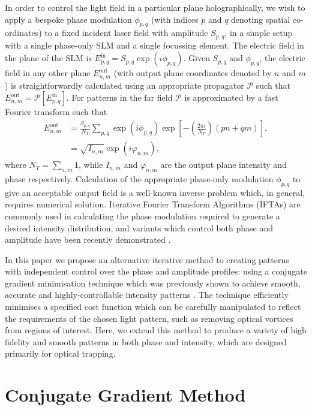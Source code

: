 \documentclass[amsmath,onecolumn,superscriptaddress,notitlepage]{revtex4-1}
\begin{document}
In order to control the light field in a particular plane holographically, we wish to apply a bespoke phase modulation $\phi_{p,q}$ (with indices $p$ and $q$ denoting spatial co-ordinates) to a fixed incident laser field with amplitude $S_{p,q}$, in a simple setup with a single phase-only SLM and a single focussing element. The electric field in the plane of the SLM is $E^{\text{in}}_{p,q} = S_{p,q}\exp\left(i\phi_{p,q}\right)$. Given $S_{p,q}$ and $\phi_{p,q}$, the electric field in any other plane $E^{\text{out}}_{n,m}$ (with output plane coordinates denoted by $n$ and $m$) is straightforwardly calculated using an appropriate propagator $\mathcal{P}$ such that $E^{\text{out}}_{n,m}=\mathcal{P}\left[E^{\text{in}}_{p,q}\right]$. For patterns in the far field $\mathcal{P}$ is approximated by a fast Fourier transform \cite{Goodman+96} such that
\begin{align}
E^{\text{out}}_{n,m} &= \frac{S_{p,q}}{N_{T}}\sum_{p,q}\exp\left(i\phi_{p,q}\right)\exp\left[-\left(\frac{2\pi i}{N_{T}}\right)\left(pn + qm\right)\right], \label{equation:Eout1} \\
&= \sqrt{I_{n,m}}\exp\left(i\varphi_{n,m}\right), \label{equation:Eout2}
\end{align}
where $N_{T}=\sum_{n,m}1$, while $I_{n,m}$ and $\varphi_{n,m}$ are the output plane intensity and phase respectively. Calculation of the appropriate phase-only modulation $\phi_{p,q}$ to give an acceptable output field is a well-known inverse problem which, in general, requires numerical solution. Iterative Fourier Transform Algorithms (IFTAs) are commonly used in calculating the phase modulation required to generate a desired intensity distribution, and variants which control both phase and amplitude have been recently demonstrated \cite{Tao+15,Wu+15}.  

In this paper we propose an alternative iterative method to creating patterns with independent control over the phase and amplitude profiles: using a conjugate gradient minimisation technique which was previously shown to achieve smooth, accurate and highly-controllable intensity patterns \cite{Harte+14}. The technique efficiently minimises a specified cost function which can be carefully manipulated to reflect the requirements of the chosen light pattern, such as removing optical vortices from regions of interest. Here, we extend this method to produce a variety of high fidelity and smooth patterns in both phase and intensity, which are designed primarily for optical trapping. 

\section{Conjugate Gradient Method}
\end{document}
